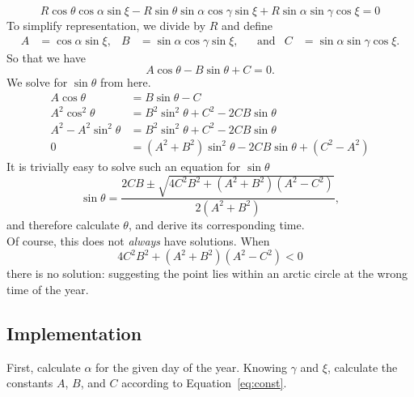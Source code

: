 \documentclass[12pt,a4paper]{article}
\begin{document}
\begin{equation}
R\cos\theta\cos\alpha\sin\xi -R \sin\theta\sin\alpha\cos\gamma\sin\xi + R\sin\alpha\sin\gamma\cos\xi = 0
\end{equation}
To simplify representation, we divide by \(R\) and define
\begin{align}\label{eq:const}
A&= \cos\alpha\sin\xi, & B&= \sin\alpha\cos\gamma\sin\xi, & &\text{and} & C&=\sin\alpha\sin\gamma\cos\xi.
\end{align}
So that we have
\begin{equation}
A\cos\theta - B\sin\theta + C = 0.
\end{equation}
We solve for \(\sin\theta\) from here.
\begin{align}
A\cos\theta  &=  B\sin\theta - C \\
A^{2}\cos^{2}\theta  &=  B^{2}\sin^{2}\theta + C^{2} - 2CB\sin\theta \\
A^{2} - A^{2}\sin^{2}\theta  &=  B^{2}\sin^{2}\theta + C^{2} - 2CB\sin\theta \\
0&=  (A^{2} + B^{2})\sin^{2}\theta - 2CB\sin\theta  + (C^{2}-A^{2})
\end{align}
It is trivially easy to solve such an equation for \(\sin\theta\)
\begin{equation}
\sin\theta = \dfrac{2CB \pm \sqrt{4C^{2}B^{2} + (A^{2}+B^{2})(A^{2}-C^{2}) }}{2(A^{2}+B^{2})},
\end{equation}
and therefore calculate \(\theta\), and derive its corresponding time.  \\[10pt]

Of course, this does not \textit{always} have solutions. When 
\begin{equation}\label{eq:test}
4C^{2}B^{2} + (A^{2}+B^{2})(A^{2}-C^{2})  < 0
\end{equation}
there is no solution: suggesting the point lies within an arctic circle at the wrong time of the year.


\subsection{Implementation}
First, calculate \(\alpha\) for the given day of the year. Knowing \(\gamma\) and \(\xi\), calculate the constants \(A\), \(B\), and \(C\) according to Equation~\eqref{eq:const}.\\
\end{document}
